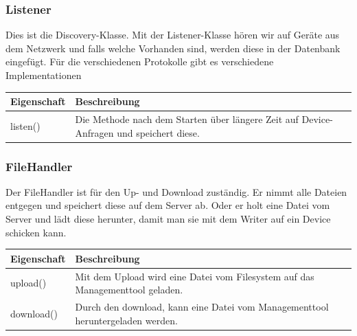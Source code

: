 \subsubsection{Listener}
Dies ist die Discovery-Klasse. Mit der Listener-Klasse hören wir auf Geräte aus dem Netzwerk und falls welche Vorhanden sind, werden diese in der Datenbank eingefügt. Für die verschiedenen Protokolle gibt es verschiedene Implementationen
\begin{table}[H]
\centering
    \begin{tabular}{@{}l p{14.1cm} @{}}\toprule    
    {Eigenschaft} & {Beschreibung}\\ \midrule
    listen() &  Die Methode nach dem Starten über längere Zeit auf Device-Anfragen und speichert diese.\\
    \bottomrule
    \end{tabular}
\end{table}



\subsubsection{FileHandler}
Der FileHandler ist für den Up- und Download zuständig. Er nimmt alle Dateien entgegen und speichert diese auf dem Server ab. Oder er holt eine Datei vom Server und lädt diese herunter, damit man sie mit dem Writer auf ein Device schicken kann.
\begin{table}[H]
\centering
    \begin{tabular}{@{}l p{14.1cm} @{}}\toprule    
    {Eigenschaft} & {Beschreibung}\\ \midrule 
    upload() & Mit dem Upload wird eine Datei vom Filesystem auf das Managementtool geladen. \\
    download() & Durch den download, kann eine Datei vom Managementtool heruntergeladen werden. \\
    \bottomrule
    \end{tabular}
\end{table}

